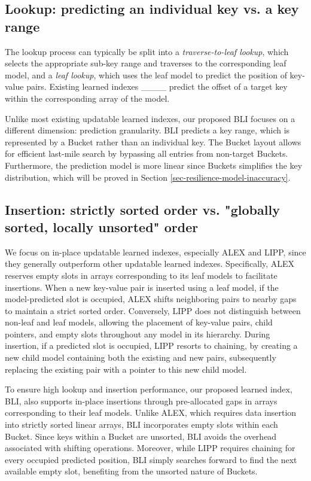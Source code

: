 \subsection{Lookup: predicting an individual key vs. a key range}
The lookup process can typically be split into a \textit{traverse-to-leaf lookup}, which selects the appropriate sub-key range and traverses to the corresponding leaf model, and a \textit{leaf lookup}, which uses the leaf model to predict the position of key-value pairs. Existing learned indexes ____ predict the offset of a target key within the corresponding array of the model.

Unlike most existing updatable learned indexes, our proposed BLI focuses on a different dimension: prediction granularity.
BLI predicts a key range, which is represented by a Bucket rather than an individual key. The Bucket layout allows for efficient last-mile search by bypassing all entries from non-target Buckets. Furthermore, the prediction model is more linear since Buckets simplifies the key distribution, which will be proved in Section \ref{sec-resilience-model-inaccuracy}.

\subsection{Insertion: strictly sorted order vs. "globally sorted, locally unsorted" order }
We focus on in-place updatable learned indexes, especially ALEX and LIPP, since they generally outperform other updatable learned indexes. Specifically, ALEX reserves empty slots in arrays corresponding to its leaf models to facilitate insertions. When a new key-value pair is inserted using a leaf model, if the model-predicted slot is occupied, ALEX shifts neighboring pairs to nearby gaps to maintain a strict sorted order. %
Conversely, LIPP does not distinguish between non-leaf and leaf models, allowing the placement of key-value pairs, child pointers, and empty slots throughout any model in its hierarchy. During insertion, if a predicted slot is occupied, LIPP resorts to chaining, %
by creating a new child model containing both the existing and new pairs, subsequently replacing the existing pair with a pointer to this new child model.

To ensure high lookup and insertion performance, our proposed learned index, BLI, also supports in-place insertions through pre-allocated gaps in arrays corresponding to their leaf models. Unlike ALEX, which requires data insertion into strictly sorted linear arrays, BLI incorporates empty slots within each Bucket. Since keys within a Bucket are unsorted, BLI avoids the overhead associated with shifting operations. Moreover, while LIPP requires chaining for every occupied predicted position, BLI simply searches forward to find the next available empty slot, benefiting from the unsorted nature of Buckets.


